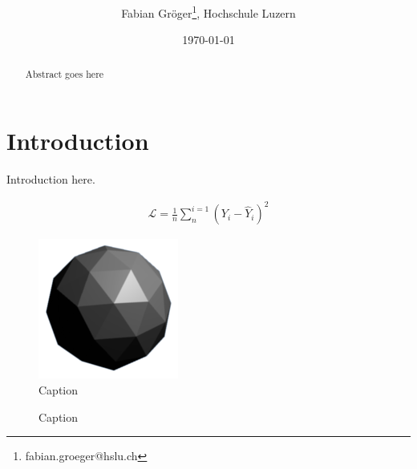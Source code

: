 \documentclass[onecolumn]{article}
\title{\vspace{-3cm}\spacecaps{Lab report: SW01 }\\ \normalsize \spacesc{TSM\_AnTeDe} }
\author{Fabian Gröger\thanks{fabian.groeger@hslu.ch}, Hochschule Luzern}
\date{\today}
\begin{document}
\maketitle

\begin{abstract}
Abstract goes here
\end{abstract}

\section{Introduction}
Introduction here.

\begin{align}
	\mathcal{L} = \frac{1}{n}\sum_n^{i=1} (Y_i - \hat{Y}_i)^2
\end{align}

\begin{figure}[t]
\centering
    \includegraphics[width=.3\linewidth]{fig/flat.png}
\caption{\label{fig:demo-bad}
Caption}
\end{figure}

\begin{figure}[t]
\centering
{}
\caption{\label{fig:demo} 
Caption}
\end{figure}

\nocite{*}


\end{document}
